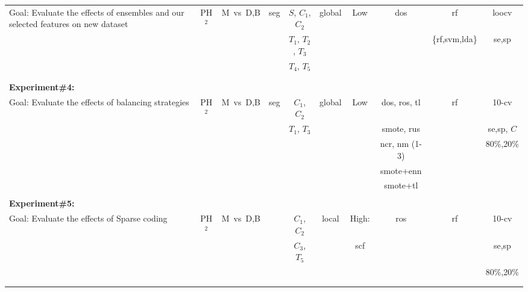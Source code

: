 \begin{landscape}
\begin{table}
\begin{center}
{\begin{tabular}{l  c	 c  c c  c  c  c  c   c  }
\multirow{3}{4cm}{Goal: Evaluate the effects of ensembles and our selected features on new dataset} &  PH$^{2}$ & M~vs~D,B & seg  & $S$, $C_{1}$, $C_{2}$ & global & Low & \ac{dos} & \ac{rf} & \ac{loocv} \\
& & & & $T_{1}$, $T_{2}$, $T_{3}$ & & & & \{\ac{rf},\ac{svm},\ac{lda}\} & \ac{se},\ac{sp}\\
& & & & $T_{4}$, $T_{5}$ & & & & & \\\\
\midrule
\\
\textbf{Experiment\#4:}  \\
\multirow{3}{4cm}{Goal: Evaluate the effects of balancing strategies} & PH$^{2}$ & M~vs~D,B  & seg  & $C_{1}$, $C_{2}$ & global & Low & \ac{dos}, \ac{ros}, \ac{tl} & \ac{rf} & 10-cv \\
& & & & $T_{1}$, $T_{3}$ & & & \ac{smote}, \ac{rus} &  & \ac{se},\ac{sp}, $C$\\
& & & & & & &  \ac{ncr}, \ac{nm} (1-3) & & 80\%,20\%\\
& & & & & & & \ac{smote}+\ac{enn} & & \\
& & & & & & & \ac{smote}+\ac{tl} & & \\
\midrule
\\
\textbf{Experiment\#5:}  \\
\multirow{3}{4cm}{Goal: Evaluate the effects of Sparse coding} & PH$^{2}$ & M~vs~D,B &   & $C_{1}$, $C_{2}$ & local & High: & \ac{ros} & \ac{rf} & 10-cv \\
& & & & $C_{3}$, $T_{5}$ & &\ac{scf}&  &  & \ac{se},\ac{sp}\\
& & & & & & & & & 80\%,20\%\\\\
\midrule
\\


\end{tabular}}
\end{center}
\label{tab:experimentstable}
\end{table}
\end{landscape}
